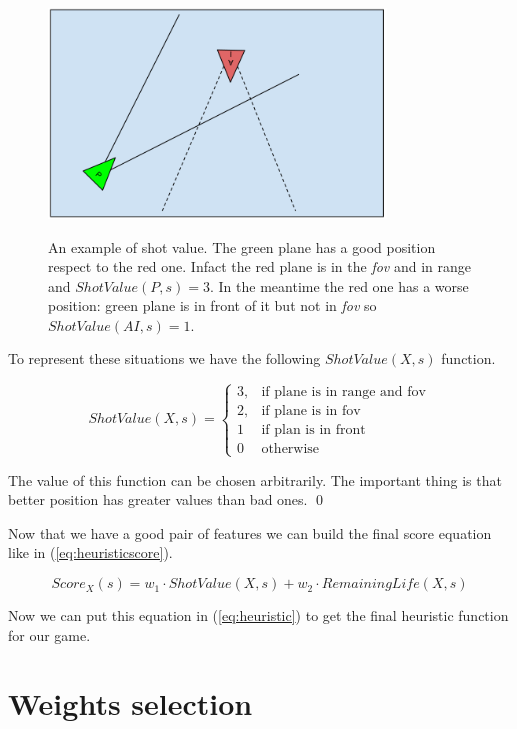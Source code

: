 \begin{figure}
  \centering
  \includegraphics[width=0.8\textwidth]{images/planefov.png}
  \label{img:planefov}
  \caption{An example of shot value. The green plane has a good position respect to the
  red one. Infact the red plane is in the \emph{fov} and in range and $ShotValue(P,s)=3$. In the
  meantime the red one has a worse position: green plane is in front of it but not in
  \emph{fov} so $ShotValue(AI,s)=1$.}
\end{figure}

To represent these situations we have the following $ShotValue(X,s)$ function.

\begin{equation}
ShotValue(X,s) = \begin{cases} 3, & \mbox{if plane is in range and fov}  \\
  2, & \mbox{if plane is in fov} \\ 1 & \mbox{if plan is in front} \\ 0 & \mbox{otherwise}
\end{cases}
\end{equation}

The value of this function can be chosen arbitrarily. The important thing is that better
position has greater values than bad ones. \qed

Now that we have a good pair of features we can build the final score equation like in
(\ref{eq:heuristicscore}).

\begin{equation}
  Score_X(s) = w_1 \cdot ShotValue(X,s) + w_2 \cdot RemainingLife(X,s)
  \label{eq:heuristicscore}
\end{equation}

Now we can put this equation in (\ref{eq:heuristic}) to get the final heuristic function
for our game.

\section{Weights selection}

